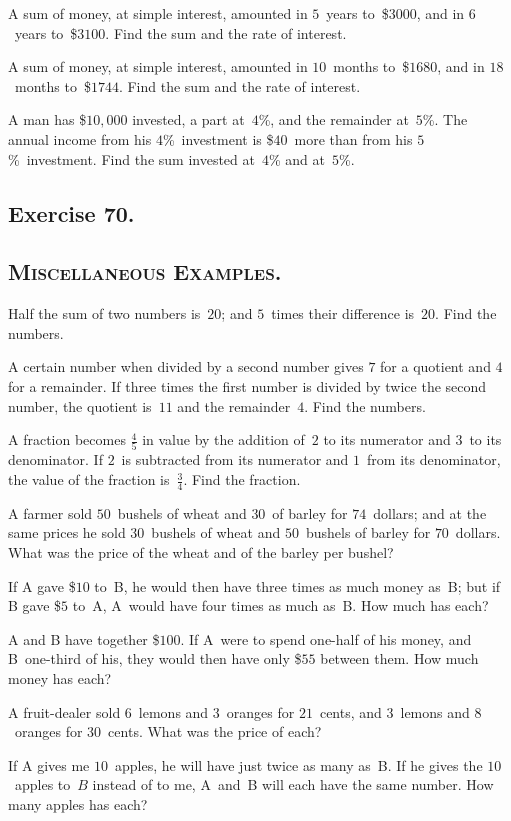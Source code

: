 \documentclass[12pt]{book}[2005/09/16]
\newcommand{\Require}[1][2\baselineskip]{%
  \setlength{\TmpLen}{\pagegoal-\pagetotal}%
  \ifthenelse{\lengthtest{0pt < \TmpLen}\and\lengthtest{\TmpLen < #1}}{%
    \vfil\newpage%
  }{}%
}
\newcommand{\Section}[1]{\subsection*{\centering\normalfont\small\scshape #1}}
\newcommand{\Exercise}[2][]{%
  \Require[3\baselineskip]
  \subsection*{\centering\small Exercise #2}
  \ifthenelse{\not\equal{#1}{}}{%
    \subsubsection*{\centering\normalfont\small\scshape #1}
  }{}
  \phantomsection\label{exer:#2}%
}
\newcommand{\Item}[1]{\vspace{4pt plus 16pt}\makebox[1em][r]{\textbf{#1}\ }}
\newlength{\TmpLen}
\begin{document}
\Item{1.}  A sum of money, at simple interest, amounted in $5$~years
to~\$$3000$, and in $6$~years to~\$$3100$.  Find the sum
and the rate of interest.

\Item{2.}  A sum of money, at simple interest, amounted in $10$~months
to~\$$1680$, and in $18$~months to~\$$1744$.  Find the
sum and the rate of interest.

\Item{3.}  A man has \$$10,000$ invested, a part at~$4$\%, and the
remainder at~$5$\%.  The annual income from his $4$\%~investment
is \$$40$~more than from his $5$\%~investment.  Find the
sum invested at~$4$\% and at~$5$\%.

\Exercise{70.}

\Section{Miscellaneous Examples.}

\Item{1.}  Half the sum of two numbers is~$20$; and $5$~times
their difference is~$20$.  Find the numbers.

\Item{2.}  A certain number when divided by a second number
gives $7$ for a quotient and $4$ for a remainder.  If three
times the first number is divided by twice the second
number, the quotient is~$11$ and the remainder~$4$.  Find
the numbers.

\Item{3.}  A fraction becomes $\frac{4}{5}$ in value by the addition of~$2$ to
its numerator and $3$~to its denominator.  If $2$~is subtracted
from its numerator and $1$~from its denominator, the value
of the fraction is~$\frac{3}{4}$.  Find the fraction.

\Item{4.}  A farmer sold $50$~bushels of wheat and $30$~of barley
for $74$~dollars; and at the same prices he sold $30$~bushels
of wheat and $50$~bushels of barley for $70$~dollars.  What
was the price of the wheat and of the barley per bushel?

\Item{5.}  If A gave \$$10$ to~B, he would then have three times
as much money as~B; but if B gave \$$5$ to~A, A~would
have four times as much as~B\@. How much has each?

\Item{6.}  A and B have together \$$100$.  If A~were to spend
one-half of his money, and B~one-third of his, they would
then have only \$$55$ between them.  How much money
has each?

\Item{7.}  A fruit-dealer sold $6$~lemons and $3$~oranges for $21$~cents,
and $3$~lemons and $8$~oranges for $30$~cents.  What
was the price of each?

\Item{8.}  If A gives me $10$~apples, he will have just twice as
many as~B\@.  If he gives the $10$~apples to~$B$ instead of to
me, A~and~B will each have the same number.  How
many apples has each?
\end{document}
